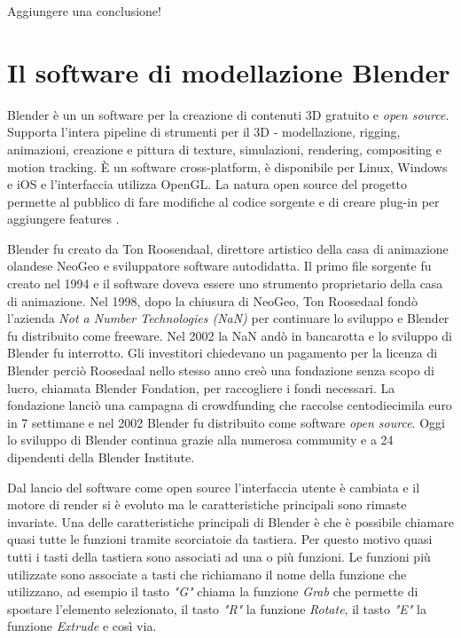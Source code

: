Aggiungere una conclusione!

\section{Il software di modellazione Blender}

Blender è un un software per la creazione di contenuti 3D gratuito e \textit{open source}.
%
Supporta l'intera pipeline di strumenti per il 3D - modellazione, rigging, animazioni, creazione e pittura di texture, simulazioni, rendering, compositing e motion tracking.
%
È un software cross-platform, è disponibile per Linux, Windows e iOS e l'interfaccia utilizza OpenGL.
%
La natura open source del progetto permette al pubblico di fare modifiche al codice sorgente e di creare plug-in per aggiungere features \cite{BlenderAbout}.

Blender fu creato da Ton Roosendaal, direttore artistico della casa di animazione olandese NeoGeo e sviluppatore software autodidatta. 
%
Il primo file sorgente fu creato nel 1994 e il software doveva essere uno strumento proprietario della casa di animazione.
%
Nel 1998, dopo la chiusura di NeoGeo, Ton Roosedaal fondò l'azienda \textit{Not a Number Technologies (NaN)} per continuare lo sviluppo e Blender fu distribuito come freeware. 
%
Nel 2002 la NaN andò in bancarotta e lo sviluppo di Blender fu interrotto.
%
Gli investitori chiedevano un pagamento per la licenza di Blender perciò Roosedaal nello stesso anno creò una fondazione senza scopo di lucro, chiamata Blender Fondation, per raccogliere i fondi necessari.
%
La fondazione lanciò una campagna di crowdfunding che raccolse centodiecimila euro in 7 settimane e nel 2002 Blender fu distribuito come software \textit{open source}.
%
Oggi lo sviluppo di Blender continua grazie alla numerosa community e a 24 dipendenti della Blender Institute.

Dal lancio del software come open source l'interfaccia utente è cambiata e il motore di render si è evoluto ma le caratteristiche principali sono rimaste invariate.
%
Una delle caratteristiche principali di Blender è che è possibile chiamare quasi tutte le funzioni tramite scorciatoie da tastiera. 
%
Per questo motivo quasi tutti i tasti della tastiera sono associati ad una o più funzioni. 
%
Le funzioni più utilizzate sono associate a tasti che richiamano il nome della funzione che utilizzano, ad esempio il tasto \textit{"G"} chiama la funzione \textit{Grab} che permette di spostare l'elemento selezionato, il tasto \textit{"R"} la funzione \textit{Rotate}, il tasto \textit{"E"} la funzione \textit{Extrude} e così via.

